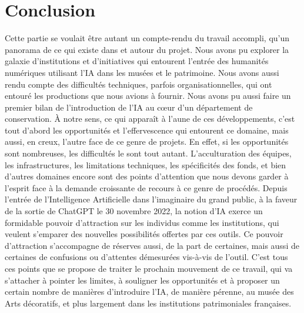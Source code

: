 \chapter*{Conclusion}

Cette partie se voulait être autant un compte-rendu du travail accompli, qu'un panorama de ce qui existe dans et autour du projet. Nous avons pu explorer la galaxie d'institutions et d'initiatives qui entourent l'entrée des humanités numériques utilisant l'IA dans les musées et le patrimoine. Nous avons aussi rendu compte des difficultés techniques, parfois organisationnelles, qui ont entouré les productions que nous avions à fournir. Nous avons pu aussi faire un premier bilan de l'introduction de l'IA au cœur d'un département de conservation. À notre sens, ce qui apparaît à l'aune de ces développements, c'est tout d'abord les opportunités et l'effervescence qui entourent ce domaine, mais aussi, en creux, l'autre face de ce genre de projets. En effet, si les opportunités sont nombreuses, les difficultés le sont tout autant. L'acculturation des équipes, les infrastructures, les limitations techniques, les spécificités des fonds, et bien d'autres domaines encore sont des points d'attention que nous devons garder à l'esprit face à la demande croissante de recours à ce genre de procédés. Depuis l'entrée de l'Intelligence Artificielle dans l'imaginaire du grand public, à la faveur de la sortie de ChatGPT le 30 novembre 2022, la notion d'IA exerce un formidable pouvoir d'attraction sur les individus comme les institutions, qui veulent s'emparer des nouvelles possibilités offertes par ces outils. Ce pouvoir d'attraction s'accompagne de réserves aussi, de la part de certain\wokisme e\wokisme s, mais aussi de certaines de confusions ou d'attentes démesurées vis-à-vis de l'outil. C'est tous ces points que se propose de traiter le prochain mouvement de ce travail, qui va s'attacher à pointer les limites, à souligner les opportunités et à proposer un certain nombre de manières d'introduire l'IA, de manière pérenne, au musée des Arts décoratifs, et plus largement dans les institutions patrimoniales françaises.
